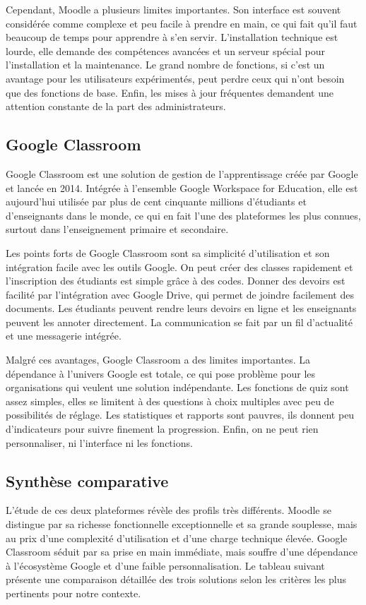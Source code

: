 \documentclass[12pt,a4paper]{report}
\begin{document}
Cependant, Moodle a plusieurs limites importantes. Son interface est souvent considérée comme complexe et peu facile à prendre en main, ce qui fait qu'il faut beaucoup de temps pour apprendre à s'en servir. L'installation technique est lourde, elle demande des compétences avancées et un serveur spécial pour l'installation et la maintenance. Le grand nombre de fonctions, si c'est un avantage pour les utilisateurs expérimentés, peut perdre ceux qui n'ont besoin que des fonctions de base. Enfin, les mises à jour fréquentes demandent une attention constante de la part des administrateurs.

\subsection{Google Classroom}
Google Classroom est une solution de gestion de l'apprentissage créée par Google et lancée en 2014. Intégrée à l'ensemble Google Workspace for Education, elle est aujourd'hui utilisée par plus de cent cinquante millions d'étudiants et d'enseignants dans le monde, ce qui en fait l'une des plateformes les plus connues, surtout dans l'enseignement primaire et secondaire.

Les points forts de Google Classroom sont sa simplicité d'utilisation et son intégration facile avec les outils Google. On peut créer des classes rapidement et l'inscription des étudiants est simple grâce à des codes. Donner des devoirs est facilité par l'intégration avec Google Drive, qui permet de joindre facilement des documents. Les étudiants peuvent rendre leurs devoirs en ligne et les enseignants peuvent les annoter directement. La communication se fait par un fil d'actualité et une messagerie intégrée.

Malgré ces avantages, Google Classroom a des limites importantes. La dépendance à l'univers Google est totale, ce qui pose problème pour les organisations qui veulent une solution indépendante. Les fonctions de quiz sont assez simples, elles se limitent à des questions à choix multiples avec peu de possibilités de réglage. Les statistiques et rapports sont pauvres, ils donnent peu d'indicateurs pour suivre finement la progression. Enfin, on ne peut rien personnaliser, ni l'interface ni les fonctions.

\subsection{Synthèse comparative}

L'étude de ces deux plateformes révèle des profils très différents. Moodle se distingue par sa richesse fonctionnelle exceptionnelle et sa grande souplesse, mais au prix d'une complexité d'utilisation et d'une charge technique élevée. Google Classroom séduit par sa prise en main immédiate, mais souffre d'une dépendance à l'écosystème Google et d'une faible personnalisation. Le tableau suivant présente une comparaison détaillée des trois solutions selon les critères les plus pertinents pour notre contexte.
\end{document}

